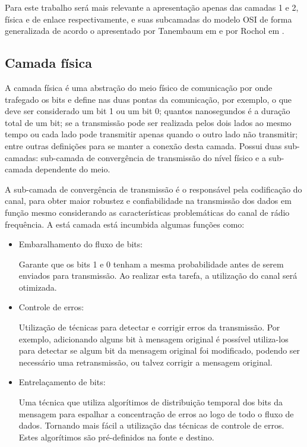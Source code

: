 Para este trabalho será mais relevante a apresentação apenas das camadas 1 e 2, física e de enlace respectivamente, e suas subcamadas do modelo OSI de forma generalizada de acordo o apresentado por Tanembaum em \cite{tanembaum2011} e por Rochol em \cite{rochol2018sistemas}.

\subsection{Camada física}
A camada física é uma abstração do meio físico de comunicação por onde trafegado os bits e define nas duas pontas da comunicação, por exemplo, o que deve ser considerado um bit 1 ou um bit 0; quantos nanosegundos é a duração total de um bit; se a transmissão pode ser realizada pelos dois lados ao mesmo tempo ou cada lado pode transmitir apenas quando o outro lado não transmitir; entre outras definições para se manter a conexão desta camada. Possui duas sub-camadas: sub-camada de convergência de transmissão do nível físico e a sub-camada dependente do meio.

A sub-camada de convergência de transmissão é o responsável pela codificação do canal, para obter maior robustez e confiabilidade na transmissão dos dados em função mesmo considerando as características problemáticas do canal de rádio frequência. A está camada está incumbida algumas funções como:
\begin{itemize}
      \item Embaralhamento do fluxo de bits:

            Garante que os bits 1 e 0 tenham a mesma probabilidade antes de serem enviados para transmissão. Ao realizar esta tarefa, a utilização do canal será otimizada.
      \item Controle de erros:

            Utilização de técnicas para detectar e corrigir erros da transmissão. Por exemplo, adicionando alguns bit à mensagem original é possível utiliza-los para detectar se algum bit da mensagem original foi modificado, podendo ser necessário uma retransmissão, ou talvez corrigir a mensagem original.
      \item Entrelaçamento de bits:

            Uma técnica que utiliza algorítimos de distribuição temporal dos bits da mensagem para espalhar a concentração de erros ao logo de todo o fluxo de dados. Tornando mais fácil a utilização das técnicas de controle de erros. Estes algorítimos são pré-definidos na fonte e destino.
\end{itemize}

